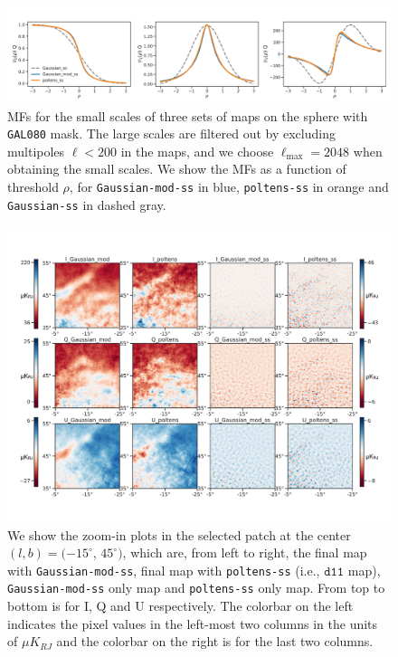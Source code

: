 \documentclass[twocolumn]{aastex631}
\begin{document}
\begin{figure}
    \centering
    \includegraphics[width=180mm]{figures/MFs_80p_sky_Q.pdf}
    \caption{MFs for the small scales of three sets of maps on the sphere with \texttt{GAL080} mask. The large scales are filtered out by excluding multipoles $\ell < 200$ in the maps, and we choose $\ell_\text{max} = 2048$ when obtaining the small scales. We show the MFs as a function of threshold $\rho$, for \texttt{Gaussian-mod-ss} in blue, \texttt{poltens-ss} in orange and \texttt{Gaussian-ss} in dashed gray.}
    \label{fig:MF:sphere}
\end{figure}

\begin{figure}
    \centering
    \includegraphics[width=180mm]{figures/maps_patch_345_45.pdf}
    \caption{We show the zoom-in plots in the selected patch at the center $(l, b) = (-15^{\circ}$, $45^{\circ})$, which are, from left to right, the final map with \texttt{Gaussian-mod-ss}, final map with \texttt{poltens-ss} (i.e., $\texttt{d11}$ map), \texttt{Gaussian-mod-ss} only map and \texttt{poltens-ss} only map. From top to bottom is for I, Q and U respectively. The colorbar on the left indicates the pixel values in the left-most two columns in the units of $\mu K_{RJ}$ and the colorbar on the right is for the last two columns. }
    \label{fig:maps:patch2}
\end{figure}
\end{document}
